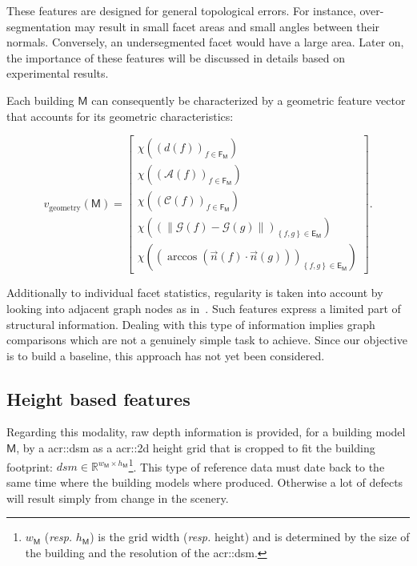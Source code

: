         These features are designed for general topological errors.
        For instance, over-segmentation may result in small facet areas and small angles between their normals.
        Conversely, an undersegmented facet would have a large area.
        Later on, the importance of these features will be discussed in details based on experimental results.
        
        Each building $\mathsf{M}$ can consequently be characterized by a geometric feature vector that accounts for its geometric characteristics:

        \begin{equation}
        	\label{eq::geometric_baseline_features}
            v_{\text{geometry}}(\mathsf{M}) = \begin{bmatrix}
            	\chi \left(\left(d\left(f\right)\right)_{f \in \mathsf{F_M}}\right)\\
                \chi \left(\left(\mathscr{A}\left(f\right)\right)_{f \in \mathsf{F_M}}\right)\\
                \chi \left(\left(\mathscr{C}\left(f\right)\right)_{f \in \mathsf{F_M}}\right)\\
                \chi \left(\left( \left\lVert \mathscr{G}\left(f\right) - \mathscr{G}\left(g\right) \right\rVert \right)_{\left\{f, g\right\} \in \mathsf{E_M}}\right)\\
                \chi \left(\left( \arccos\left(\vec{n}\left(f\right) \cdot \vec{n}\left(g\right)\right) \right)_{\left\{f, g\right\} \in \mathsf{E_M}}\right)
            \end{bmatrix}.
        \end{equation}

        Additionally to individual facet statistics, regularity is taken into account by looking into adjacent graph nodes as in~\parencite{zhou20102}.
        Such features express a limited  part of structural information.
        Dealing with this type of information implies graph comparisons which are not a genuinely simple task to achieve.
        Since our objective is to build a baseline, this approach has not yet been considered.

    \subsection{Height based features}
        \label{subsec::learned_evaluation::baseline::height}
        Regarding this modality, raw depth information is provided, for a building model \(\mathsf{M}\), by a \gls{acr::dsm} as a \gls{acr::2d} height grid that is cropped to fit the building footprint: $dsm \in \mathbb{R}^{w_{\mathsf{M}} \times h_{\mathsf{M}}}$\footnote{\label{note::w_h}\(w_{\mathsf{M}}\) (\textit{resp.} \(h_{\mathsf{M}}\)) is the grid width (\textit{resp.} height) and is determined by the size of the building and the resolution of the \gls{acr::dsm}.}.
        This type of reference data must date back to the same time where the building models where produced.
        Otherwise a lot of defects will result simply from change in the scenery.\\
        
